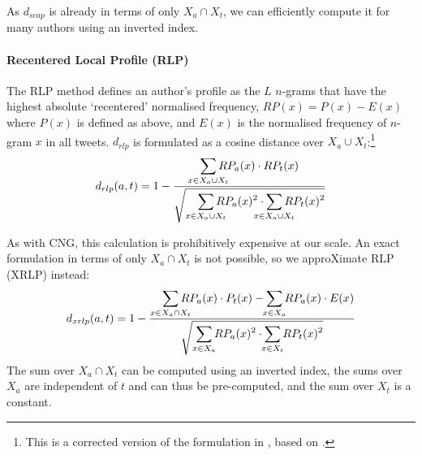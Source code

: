 \documentclass[twocolumn,10pt]{article}
\begin{document}
As $d_{scap}$ is already in terms of only $X_a \cap X_t$, we can
efficiently compute it for many authors using an inverted index.

\paragraph{Recentered Local Profile (RLP)} The RLP method\supercite{layton2012recentred}
defines an author's profile as the $L$ $n$-grams that have
the highest absolute `recentered' normalised frequency,
$RP(x) = P(x) - E(x)$ where $P(x)$ is defined as above, and
$E(x)$ is the normalised frequency of $n$-gram $x$ in all tweets.
$d_{rlp}$ is formulated as a cosine distance over
$X_a \cup X_t$:\footnote{
This is a corrected version of the formulation in \cite{layton2012recentred},
based on \cite{layton2014tutorial}.}
$$
d_{rlp}(a, t) = 1 -
\frac{\displaystyle
    \smashoperator{\sum_{x \in X_a \cup X_t}}
        RP_a(x) \cdot RP_t(x)
}{\displaystyle
    \sqrt{\smashoperator[r]{\sum_{x \in X_a \cup X_t}} RP_a(x)^2
    \cdot \smashoperator{\sum_{x \in X_a \cup X_t}} RP_t(x)^2}
}
$$

As with CNG, this calculation is prohibitively expensive at our scale.
An exact formulation in terms of only $X_a \cap X_t$ is not possible,
so we approXimate RLP (XRLP) instead\footnotemark:
$$
d_{xrlp}(a, t) = 1 -
\frac{\displaystyle
    \smashoperator[r]{\sum_{x \in X_a \cap X_t}}
        RP_a(x) \cdot P_t(x)
    - \smashoperator{\sum_{x \in X_a}}
        RP_a(x) \cdot E(x)
}{\displaystyle
    \sqrt{\smashoperator[r]{\sum_{x \in X_a}} RP_a(x)^2
    \cdot \smashoperator{\sum_{x \in X_t}} RP_t(x)^2}
}
$$
The sum over $X_a \cap X_t$ can be computed using an inverted index,
the sums over $X_a$ are independent of $t$ and can thus be pre-computed,
and the sum over $X_t$ is a constant.

\end{document}
